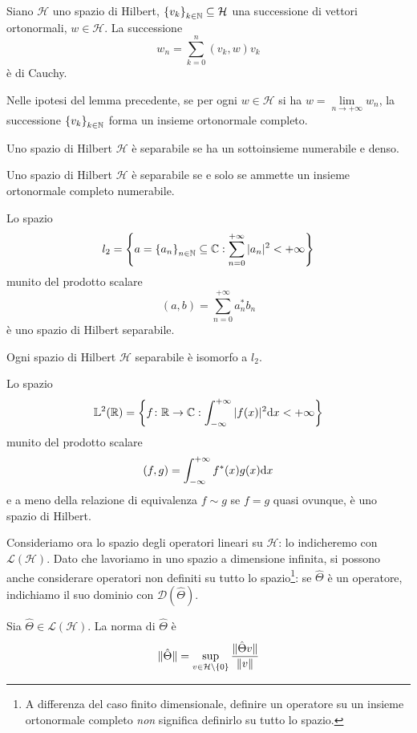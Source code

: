 \documentclass[a4paper, 11pt]{article}
\renewcommand{\H}{\mathcal{H}}
\renewcommand{\L}{\mathbb{L}}
\begin{document}
\begin{lemma}
	Siano $\H$ uno spazio di Hilbert, $\left\{v_k\right\}_{k\in \N}\subseteq\H$ una successione di vettori ortonormali, $w\in \H$. La successione
	\[w_n=\sum_{k=0}^{n}(v_k,w)v_k\]
	è di Cauchy.
\end{lemma}
\begin{definition}
	Nelle ipotesi del lemma precedente, se per ogni $w\in\H$ si ha $w=\lim\limits_{n\to+\infty}w_n$, la successione $\left\{v_k\right\}_{k\in \mathbb{N}}$ forma un insieme ortonormale completo.
\end{definition}
\begin{definition}
	Uno spazio di Hilbert $\H$ è separabile se ha un sottoinsieme numerabile e denso.
\end{definition}
\begin{theorem}
	Uno spazio di Hilbert $\H$ è separabile se e solo se ammette un insieme ortonormale completo numerabile.
\end{theorem}
\begin{theorem}
	Lo spazio
	\[l_2=\left\{a=\left\{a_n\right\}_{n\in\mathbb{N}}\subseteq \mathbb{C}:\sum_{n=0}^{+\infty}|a_n|^2<+\infty\right\}\]
	munito del prodotto scalare
	\[(a,b)=\sum_{n=0}^{+\infty}a_n^*b_n\]
	è uno spazio di Hilbert separabile.
\end{theorem}
\begin{theorem}
	Ogni spazio di Hilbert $\H$ separabile è isomorfo a $l_2$.
\end{theorem}
\begin{theorem}
	Lo spazio
	\[\L ^2(\R)=\left\{f\colon\R \to\C :\int_{-\infty}^{+\infty}|f(x)|^2\d x<+\infty\right\}\]
	munito del prodotto scalare
	\[(f,g)=\int_{-\infty}^{+\infty}f^*(x)g(x)\mathrm{d} x\]
	e a meno della relazione di equivalenza $f\sim g$ se $f=g$ quasi ovunque, è uno spazio di Hilbert.
\end{theorem}
Consideriamo ora lo spazio degli operatori lineari su $\H$: lo indicheremo con $\mathcal{L}(\H)$. Dato che lavoriamo in uno spazio a dimensione infinita, si possono anche considerare operatori non definiti su tutto lo spazio\footnote{A differenza del caso finito dimensionale, definire un operatore su un insieme ortonormale completo \textit{non} significa definirlo su tutto lo spazio.}: se $\hat{\Theta}$ è un operatore, indichiamo il suo dominio con $\mathcal{D}(\hat{\Theta})$.
\begin{definition}
	Sia $\hat{\Theta}\in\mathcal{L}(\H)$. La norma di $\hat{\Theta}$ è
	\[\Vert \hat{\Theta}\Vert=\sup_{v\in \H\backslash\{0\}}\frac{\Vert {\hat{\Theta}v}\Vert}{\norm {v}}\]
\end{definition}
\end{document}
